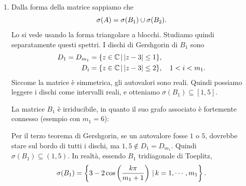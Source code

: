 \documentclass[a4paper]{article}
\begin{document}
\begin{snippetsolution}{}
    \begin{enumerate}
        \item Dalla forma della matrice sappiamo che
            \[
                \sigma(A) = \sigma(B_1) \cup \sigma(B_2).
            \]
            Lo si vede usando la forma triangolare a blocchi.
            Studiamo quindi separatamente questi spettri. I dischi di Gershgorin di \(B_1\) sono
            \begin{align*}
                D_1 = D_{m_1} &= \{ z \in \mathbb{C} \,|\, |z-3| \leq 1\}, \\
                D_i &= \{ z \in \mathbb{C} \,|\, |z-3| \leq 2\},
                \quad 1 < i < m_1.
            \end{align*}
            Siccome la matrice è simmetrica, gli autovalori sono reali.
            Quindi possiamo leggere i dischi come intervalli reali, e otteniamo
            \(\sigma(B_1) \subseteq [1,5]\).

            La matrice \(B_1\) è irriducibile, in quanto il suo grafo associato è fortemente connesso
            (esempio con \(m_1 = 6\)):
            \begin{center}
            \end{center}
            Per il terzo teorema di Gershgorin, se un autovalore fosse \(1\) o \(5\),
            dovrebbe stare sul bordo di tutti i dischi, ma \(1,5 \notin D_1 = D_{m_1}\).
            Quindi \(\sigma(B_1) \subseteq (1,5)\). In realtà, essendo \(B_1\) tridiagonale di Toeplitz,
            \[
                \sigma(B_1) =
                \left\{
                    3 - 2\cos\left(\frac{k\pi}{m_1+1}\right)
                    \,|\, k=1,\cdots,m_1
                \right\}.
            \]


\end{enumerate}
\end{snippetsolution}
\end{document}
